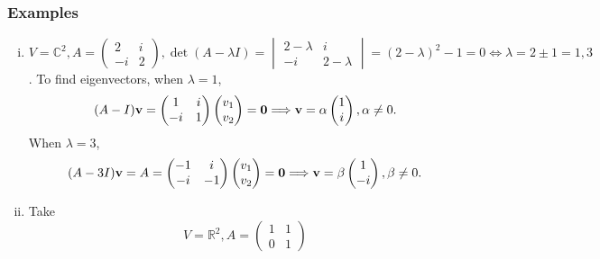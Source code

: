\documentclass[10pt]{article}
\def\i{{\mathrm i}}
\begin{document}
    \subsubsection{Examples}
    \begin{example}
        \begin{enumerate}[(i)]
            \item $V=\mathbb{C}^{2}, A=\begin{pmatrix}
                2&i\\-i&2
            \end{pmatrix}, \det (A-\lambda I)=\begin{vmatrix}
                2-\lambda & i\\-i & 2-\lambda
            \end{vmatrix}=(2-\lambda)^2-1=0 \Leftrightarrow \lambda=2\pm 1=1,3 $. To find eigenvectors, when $ \lambda=1 $,
            \[
                (A-I){\bf v}=\begin{pmatrix}
                    1&i\\-i&1
                \end{pmatrix}
                \begin{pmatrix}
                    v_1\\v_2
                \end{pmatrix}=\mathbf{0} \Longrightarrow {\bf v}=\alpha\begin{pmatrix}
                    1\\i
                \end{pmatrix},\alpha\neq 0
            .\]
            When $ \lambda=3 $,
            \[
                (A-3I){\bf v}=A=\begin{pmatrix}
                    -1&i\\-i&-1
                \end{pmatrix}\begin{pmatrix}
                    v_1\\v_2
                \end{pmatrix}=\mathbf{0} \Longrightarrow 
                {\bf v}=\beta\begin{pmatrix}
                    1\\-i
                \end{pmatrix},\beta\neq 0
            .\]
            \item Take 
            \[
                V=\mathbb{R}^{2},A=\begin{pmatrix}
                    1&1\\0&1

\end{pmatrix}\]
\end{enumerate}
\end{example}
\end{document}
